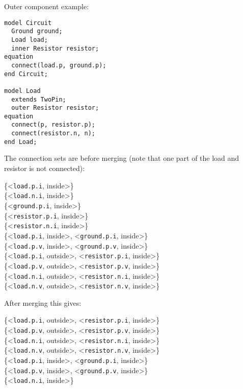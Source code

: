 \begin{example}
Outer component example:
\begin{lstlisting}[language=modelica]
model Circuit
  Ground ground;
  Load load;
  inner Resistor resistor;
equation
  connect(load.p, ground.p);
end Circuit;

model Load
  extends TwoPin;
  outer Resistor resistor;
equation
  connect(p, resistor.p);
  connect(resistor.n, n);
end Load;
\end{lstlisting}
The connection sets are before merging (note that one part of the load and resistor is not connected):

\{\textless{}\lstinline!load.p.i!, inside\textgreater{}\}\\
\{\textless{}\lstinline!load.n.i!, inside\textgreater{}\}\\
\{\textless{}\lstinline!ground.p.i!, inside\textgreater{}\}\\
\{\textless{}\lstinline!resistor.p.i!, inside\textgreater{}\}\\
\{\textless{}\lstinline!resistor.n.i!, inside\textgreater{}\}\\
\{\textless{}\lstinline!load.p.i!, inside\textgreater{}, \textless{}\lstinline!ground.p.i!, inside\textgreater{}\}\\
\{\textless{}\lstinline!load.p.v!, inside\textgreater{}, \textless{}\lstinline!ground.p.v!, inside\textgreater{}\}\\
\{\textless{}\lstinline!load.p.i!, outside\textgreater{}, \textless{}\lstinline!resistor.p.i!, inside\textgreater{}\}\\
\{\textless{}\lstinline!load.p.v!, outside\textgreater{}, \textless{}\lstinline!resistor.p.v!, inside\textgreater{}\}\\
\{\textless{}\lstinline!load.n.i!, outside\textgreater{}, \textless{}\lstinline!resistor.n.i!, inside\textgreater{}\}\\
\{\textless{}\lstinline!load.n.v!, outside\textgreater{}, \textless{}\lstinline!resistor.n.v!, inside\textgreater{}\}

After merging this gives:

\{\textless{}\lstinline!load.p.i!, outside\textgreater{}, \textless{}\lstinline!resistor.p.i!, inside\textgreater{}\}\\
\{\textless{}\lstinline!load.p.v!, outside\textgreater{}, \textless{}\lstinline!resistor.p.v!, inside\textgreater{}\}\\
\{\textless{}\lstinline!load.n.i!, outside\textgreater{}, \textless{}\lstinline!resistor.n.i!, inside\textgreater{}\}\\
\{\textless{}\lstinline!load.n.v!, outside\textgreater{}, \textless{}\lstinline!resistor.n.v!, inside\textgreater{}\}\\
\{\textless{}\lstinline!load.p.i!, inside\textgreater{}, \textless{}\lstinline!ground.p.i!, inside\textgreater{}\}\\
\{\textless{}\lstinline!load.p.v!, inside\textgreater{}, \textless{}\lstinline!ground.p.v!, inside\textgreater{}\}\\
\{\textless{}\lstinline!load.n.i!, inside\textgreater{}\}


\end{example}
